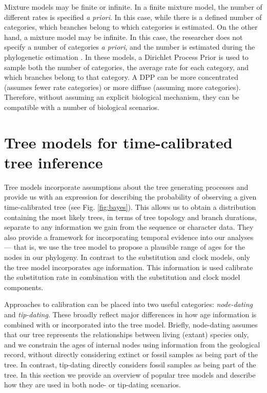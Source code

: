 Mixture models may be finite or infinite.
In a finite mixture model, the number of different rates is specified \textit{a priori}. 
In this case, while there is a defined number of categories, which branches belong to which categories is estimated.
On the other hand, a mixture model may be infinite.
In this case, the researcher does not specify a number of categories \textit{a priori}, and the number is estimated during the phylogenetic estimation \citep{Heath2012a}.
In these models, a Dirichlet Process Prior is used to sample both the number of categories, the average rate for each category, and which branches belong to that category.
A DPP can be more concentrated (assumes fewer rate categories) or more diffuse (assuming more categories).
Therefore, without assuming an explicit biological mechanism, they can be compatible with a number of biological scenarios. 

\section{Tree models for time-calibrated tree inference}


Tree models incorporate assumptions about the tree generating processes and provide us with an expression for describing the probability of observing a given time-calibrated tree (see Fig. \ref{fig:bayes}). This allows us to obtain a distribution containing the most likely trees, in terms of tree topology and branch durations, separate to any information we gain from the sequence or character data.
They also provide a framework for incorporating temporal evidence into our analyses --- that is, we use the tree model to propose a plausible range of ages for the nodes in our phylogeny.
In contrast to the substitution and clock models, only the tree model incorporates age information. %
This information is used calibrate the substitution rate in combination with the substitution and clock model components.

Approaches to calibration can be placed into two useful categories: \textit{node-dating} and \textit{tip-dating}. 
These broadly reflect major differences in how age information is combined with or incorporated into the tree model.
Briefly, node-dating assumes that our tree represents the relationships between living (extant) species only, and we constrain the ages of internal nodes using information from the geological record, without directly considering extinct or fossil samples as being part of the tree.
In contrast, tip-dating directly considers fossil samples as being part of the tree.
In this section we provide an overview of popular tree models and describe how they are used in both node- or tip-dating scenarios.


